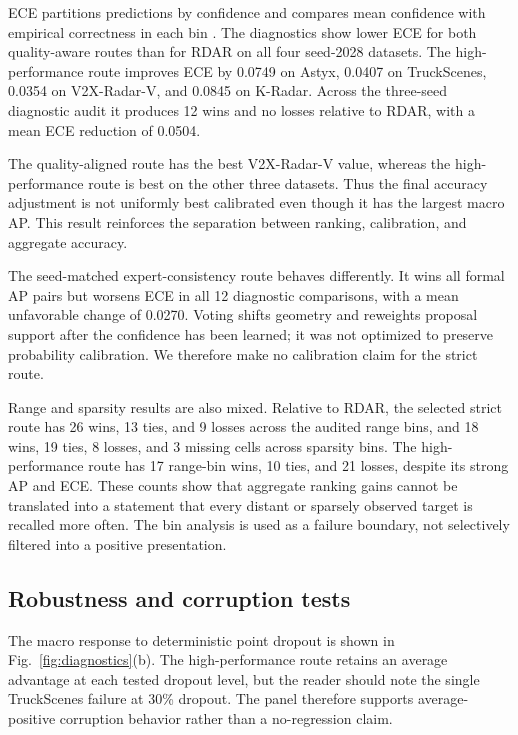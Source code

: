 \documentclass[preprint,12pt,times]{elsarticle}
\newcommand{\figref}[1]{\textcolor{floatreviewblue}{Fig.~\ref{#1}}}
\newcommand{\figref}[1]{Fig.~\ref{#1}}
\begin{document}
ECE partitions predictions by confidence and compares mean confidence with
empirical correctness in each bin \cite{guo2017calibration}. The diagnostics
show lower ECE for both quality-aware routes than for RDAR on all four
seed-2028 datasets. The high-performance route improves ECE by 0.0749 on
Astyx, 0.0407 on TruckScenes, 0.0354 on V2X-Radar-V, and 0.0845 on K-Radar.
Across the three-seed diagnostic audit it produces 12 wins and no losses
relative to RDAR, with a mean ECE reduction of 0.0504.

The quality-aligned route has the best V2X-Radar-V value, whereas the
high-performance route is best on the other three datasets. Thus the final
accuracy adjustment is not uniformly best calibrated even though it has the
largest macro AP. This result reinforces the separation between ranking,
calibration, and aggregate accuracy.

The seed-matched expert-consistency route behaves differently. It wins all
formal AP pairs but
worsens ECE in all 12 diagnostic comparisons, with a mean unfavorable change
of 0.0270. Voting shifts geometry and reweights proposal support after the
confidence has been learned; it was not optimized to preserve probability
calibration. We therefore make no calibration claim for the strict route.

Range and sparsity results are also mixed. Relative to RDAR, the selected strict route has
26 wins, 13 ties, and 9 losses across the audited range bins, and 18 wins, 19
ties, 8 losses, and 3 missing cells across sparsity bins. The high-performance
route has 17 range-bin wins, 10 ties, and 21 losses, despite its strong AP and
ECE. These counts show that aggregate ranking gains cannot be translated into
a statement that every distant or sparsely observed target is recalled more
often. The bin analysis is used as a failure boundary, not selectively
filtered into a positive presentation.

\subsection{Robustness and corruption tests}

The macro response to deterministic point dropout is shown in
\figref{fig:diagnostics}(b). The high-performance route retains an average
advantage at each tested dropout level, but the reader should note the single
TruckScenes failure at 30\% dropout. The panel therefore supports
average-positive corruption behavior rather than a no-regression claim.
\end{document}
